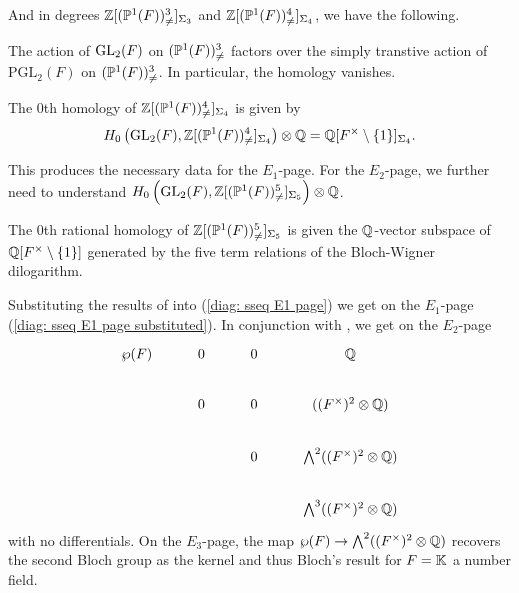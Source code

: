 And in degrees $\mathbb{Z}[(\mathbb{P}^{1}(F))^{3}_{\neq}]_{\Sigma_{3}}$ and $\mathbb{Z}[(\mathbb{P}^{1}(F))^{4}_{\neq}]_{\Sigma_{4}}$, we have the following. 
\begin{proposition}\label{prop: action on P1 3}
    The action of $\mathrm{GL}_{2}(F)$ on $(\mathbb{P}^{1}(F))^{3}_{\neq}$ factors over the simply transtive action of $\mathrm{PGL}_{2}(F)$ on $(\mathbb{P}^{1}(F))^{3}_{\neq}$. In particular, the homology vanishes. 
\end{proposition}
\begin{proposition}\label{prop: action on P1 4}
    The 0th homology of $\mathbb{Z}[(\mathbb{P}^{1}(F))^{4}_{\neq}]_{\Sigma_{4}}$ is given by 
    $$H_{0}\left(\mathrm{GL}_{2}(F),\mathbb{Z}[(\mathbb{P}^{1}(F))^{4}_{\neq}]_{\Sigma_{4}}\right)\otimes\mathbb{Q}=\mathbb{Q}[F^{\times}\setminus\{1\}]_{\Sigma_{4}}.$$
\end{proposition}
This produces the necessary data for the $E_{1}$-page. For the $E_{2}$-page, we further need to understand $H_{0}\left(\mathrm{GL}_{2}(F),\mathbb{Z}[(\mathbb{P}^{1}(F))^{5}_{\neq}]_{\Sigma_{5}}\right)\otimes\mathbb{Q}$. 
\begin{proposition}\label{prop: action on P1 5}
    The 0th rational homology of $\mathbb{Z}[(\mathbb{P}^{1}(F))^{5}_{\neq}]_{\Sigma_{5}}$ is given the $\mathbb{Q}$-vector subspace of $\mathbb{Q}[F^{\times}\setminus\{1\}]$ generated by the five term relations of the Bloch-Wigner dilogarithm. 
\end{proposition}
Substituting the results of  into (\ref{diag: sseq E1 page}) we get on the $E_{1}$-page (\ref{diag: sseq E1 page substituted}). In conjunction with , we get on the $E_{2}$-page 
\begin{equation}\label{diag: sseq E2 page}
\begin{tikzcd}
	{\wp(F)} & 0 & 0 & \QQ \\
	& 0 & 0 & {((F^{\times})^{2}\otimes\QQ)} \\
	&& 0 & {\bigwedge^{2}((F^{\times})^{2}\otimes\QQ)} \\
	&&& {\bigwedge^{3}((F^{\times})^{2}\otimes\QQ)}
\end{tikzcd}
\end{equation}
with no differentials. On the $E_{3}$-page, the map $\wp(F)\to\bigwedge^{2}((F^{\times})^{2}\otimes\mathbb{Q})$ recovers the second Bloch group  as the kernel and thus Bloch's result  for $F=\mathbb{K}$ a number field. 

